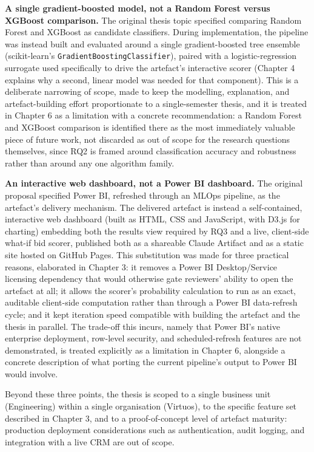 \documentclass[12pt,oneside]{report}
\begin{document}
\textbf{A single gradient-boosted model, not a Random Forest versus
XGBoost comparison.} The original thesis topic specified comparing
Random Forest and XGBoost as candidate classifiers. During
implementation, the pipeline was instead built and evaluated around a
single gradient-boosted tree ensemble (scikit-learn's
\texttt{GradientBoostingClassifier}), paired with a logistic-regression
surrogate used specifically to drive the artefact's interactive scorer
(Chapter 4 explains why a second, linear model was needed for that
component). This is a deliberate narrowing of scope, made to keep the
modelling, explanation, and artefact-building effort proportionate to a
single-semester thesis, and it is treated in Chapter 6 as a limitation
with a concrete recommendation: a Random Forest and XGBoost comparison
is identified there as the most immediately valuable piece of future
work, not discarded as out of scope for the research questions
themselves, since RQ2 is framed around classification accuracy and
robustness rather than around any one algorithm family.

\textbf{An interactive web dashboard, not a Power BI dashboard.} The
original proposal specified Power BI, refreshed through an MLOps
pipeline, as the artefact's delivery mechanism. The delivered artefact
is instead a self-contained, interactive web dashboard (built as HTML,
CSS and JavaScript, with D3.js for charting) embedding both the results
view required by RQ3 and a live, client-side what-if bid scorer,
published both as a shareable Claude Artifact and as a static site
hosted on GitHub Pages. This substitution was made for three practical
reasons, elaborated in Chapter 3: it removes a Power BI Desktop/Service
licensing dependency that would otherwise gate reviewers' ability to
open the artefact at all; it allows the scorer's probability calculation
to run as an exact, auditable client-side computation rather than
through a Power BI data-refresh cycle; and it kept iteration speed
compatible with building the artefact and the thesis in parallel. The
trade-off this incurs, namely that Power BI's native enterprise
deployment, row-level security, and scheduled-refresh features are not
demonstrated, is treated explicitly as a limitation in Chapter 6,
alongside a concrete description of what porting the current pipeline's
output to Power BI would involve.

Beyond these three points, the thesis is scoped to a single business
unit (Engineering) within a single organisation (Virtuos), to the
specific feature set described in Chapter 3, and to a proof-of-concept
level of artefact maturity: production deployment considerations such as
authentication, audit logging, and integration with a live CRM are out
of scope.
\end{document}
